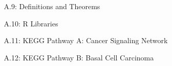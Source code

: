 \documentclass[final]{beamer}
\newlength{\sepwid}
\newlength{\onecolwid}
\newlength{\twocolwid}
\theoremstyle{definition}
\begin{document}
\begin{frame}[t]
\begin{columns}[t]
\begin{column}{\sepwid}\end{column} %
\begin{column}{\twocolwid} %
\begin{columns}[t,totalwidth=\twocolwid] %
\begin{column}{\onecolwid}\vspace{-.6in} %
\begin{alertblock}{A.9: Definitions and Theorems}

\end{alertblock}
\begin{alertblock}{A.10: R Libraries}

\end{alertblock}

\begin{alertblock}{A.11: KEGG Pathway A: Cancer Signaling Network}

\end{alertblock}

\begin{alertblock}{A.12: KEGG Pathway B: Basal Cell Carcinoma}

\end{alertblock}


\end{column}
\end{columns}
\end{column}
\end{columns}
\end{frame}
\end{document}

